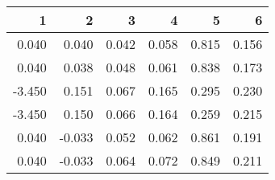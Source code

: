 \begin{table}[ht]
\centering
\begin{tabular}{rrrrrr}
  \hline
1 & 2 & 3 & 4 & 5 & 6 \\ 
  \hline
0.040 & 0.040 & 0.042 & 0.058 & 0.815 & 0.156 \\ 
  0.040 & 0.038 & 0.048 & 0.061 & 0.838 & 0.173 \\ 
  -3.450 & 0.151 & 0.067 & 0.165 & 0.295 & 0.230 \\ 
  -3.450 & 0.150 & 0.066 & 0.164 & 0.259 & 0.215 \\ 
  0.040 & -0.033 & 0.052 & 0.062 & 0.861 & 0.191 \\ 
  0.040 & -0.033 & 0.064 & 0.072 & 0.849 & 0.211 \\ 
   \hline
\end{tabular}
\end{table}

